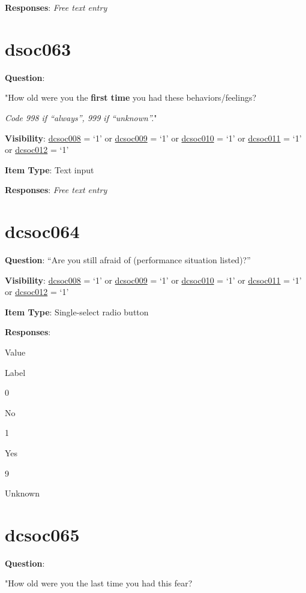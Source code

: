 \documentclass[]{book}
\begin{document}
\textbf{Responses}: \emph{Free text entry}

\hypertarget{dsoc063}{%
\section{dsoc063}\label{dsoc063}}

\textbf{Question}:

"How old were you the \textbf{first time} you had these behaviors/feelings?

\emph{Code 998 if ``always'', 999 if ``unknown''.}"

\textbf{Visibility}: \protect\hyperlink{dcsoc008}{dcsoc008} = `1' or \protect\hyperlink{dcsoc009}{dcsoc009} = `1' or \protect\hyperlink{dcsoc010}{dcsoc010} = `1' or \protect\hyperlink{dcsoc011}{dcsoc011} = `1' or \protect\hyperlink{dcsoc012}{dcsoc012} = `1'

\textbf{Item Type}: Text input

\textbf{Responses}: \emph{Free text entry}

\hypertarget{dcsoc064}{%
\section{dcsoc064}\label{dcsoc064}}

\textbf{Question}: ``Are you still afraid of (performance situation listed)?''

\textbf{Visibility}: \protect\hyperlink{dcsoc008}{dcsoc008} = `1' or \protect\hyperlink{dcsoc009}{dcsoc009} = `1' or \protect\hyperlink{dcsoc010}{dcsoc010} = `1' or \protect\hyperlink{dcsoc011}{dcsoc011} = `1' or \protect\hyperlink{dcsoc012}{dcsoc012} = `1'

\textbf{Item Type}: Single-select radio button

\textbf{Responses}:

Value

Label

0

No

1

Yes

9

Unknown

\hypertarget{dcsoc065}{%
\section{dcsoc065}\label{dcsoc065}}

\textbf{Question}:

"How old were you the last time you had this fear?
\end{document}
